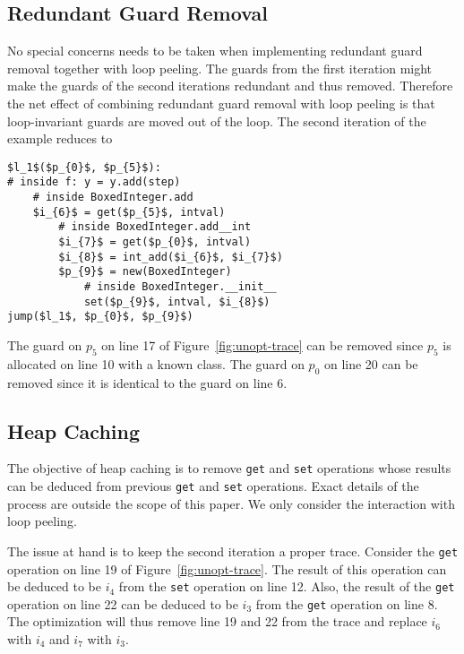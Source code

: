 \documentclass[preprint]{sigplanconf}
\begin{document}
\subsection{Redundant Guard Removal}

No special concerns needs to be taken when implementing redundant
guard removal together with loop peeling. The guards from
the first iteration might make the guards of the second iterations
redundant and thus removed. Therefore the net effect of combining redundant
guard removal with loop peeling is that loop-invariant guards are moved out of the
loop. The second iteration of the example reduces to

\begin{lstlisting}[mathescape,numbers = right,basicstyle=\setstretch{1.05}\ttfamily\scriptsize]
$l_1$($p_{0}$, $p_{5}$):
# inside f: y = y.add(step)
    # inside BoxedInteger.add
    $i_{6}$ = get($p_{5}$, intval)
        # inside BoxedInteger.add__int
        $i_{7}$ = get($p_{0}$, intval)
        $i_{8}$ = int_add($i_{6}$, $i_{7}$)
        $p_{9}$ = new(BoxedInteger)
            # inside BoxedInteger.__init__
            set($p_{9}$, intval, $i_{8}$)
jump($l_1$, $p_{0}$, $p_{9}$)
\end{lstlisting}

The guard on $p_5$ on line 17 of Figure~\ref{fig:unopt-trace} can be
removed since $p_5$ is allocated on line 10 with a known class. The
guard on $p_0$ on line 20 can be removed since it is identical to the
guard on line 6.

\subsection{Heap Caching}
The objective of heap caching is to remove \lstinline{get} and
\lstinline{set} operations whose results can be deduced from previous
\lstinline{get} and \lstinline{set} operations. Exact details of the
process are outside the scope of this paper. We only consider the interaction
with loop peeling.

The issue at hand is to keep the second iteration a proper
trace. Consider the \lstinline{get} operation on line 19 of
Figure~\ref{fig:unopt-trace}. The result of this operation can be
deduced to be $i_4$ from the \lstinline{set} operation on line
12. Also, the result of the \lstinline{get} operation on line 22 can
be deduced to be $i_3$ from the \lstinline{get} operation on line
8. The optimization will thus remove line 19 and 22 from the trace and
replace $i_6$ with $i_4$ and $i_7$ with $i_3$. 
\end{document}
